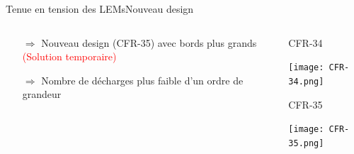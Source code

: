 \begin{frame}{Tenue en tension des LEMs}{Nouveau design}
\begin{columns}
\begin{column}{0.5\textwidth}
\begin{scriptsize}
\begin{itemize}
	    				\item[$\Rightarrow$] Nouveau design (CFR-35) avec bords plus grands \textcolor{red}{(Solution temporaire)}
	    				\item[$\Rightarrow$] Nombre de décharges plus faible d'un ordre de grandeur
	    			\end{itemize}
	    		\end{scriptsize}
    		\end{column}\hfill
    		\begin{column}{0.5\textwidth}
    			\begin{minipage}{0.48\textwidth}
    				\centering
    				\begin{scriptsize}
	    				CFR-34
	    			\end{scriptsize}
    				\texttt{[image: CFR-34.png]}
    			\end{minipage}\hfill
    			\begin{minipage}{0.48\textwidth}
    				\centering
    				\begin{scriptsize}
	    				CFR-35
    				\end{scriptsize}
    				\texttt{[image: CFR-35.png]}
    			\end{minipage}
    		\end{column}
    	\end{columns}
    \end{frame}

